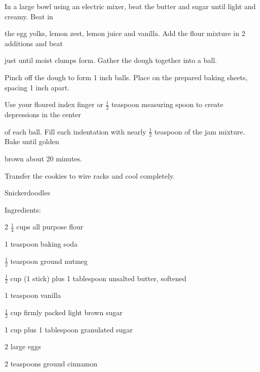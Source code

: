 \documentclass[a4paper,portrait,12pt]{book}
\begin{document}
In a large bowl using an electric mixer, beat the butter and sugar until light and creamy. Beat in




the egg yolks, lemon zest, lemon juice and vanilla. Add the flour mixture in 2 additions and beat




just until moist clumps form. Gather the dough together into a ball.




Pinch off the dough to form 1 inch balls. Place on the prepared baking sheets, spacing 1 inch apart.




Use your floured index finger or $\frac{1}{2}$ teaspoon measuring spoon to create depressions in the center




of each ball. Fill each indentation with nearly $\frac{1}{2}$ teaspoon of the jam mixture. Bake until golden




brown about 20 minutes.




Transfer the cookies to wire racks and cool completely.







\newpage
Snickerdoodles




Ingredients:




2 $\frac{1}{4}$ cups all purpose flour




1 teaspoon baking soda




$\frac{1}{2}$ teaspoon ground nutmeg




$\frac{1}{2}$ cup (1 stick) plus 1 tablespoon unsalted butter, softened




1 teaspoon vanilla




$\frac{1}{2}$ cup firmly packed light brown sugar




1 cup plus 1 tablespoon granulated sugar




2 large eggs




2 teaspoons ground cinnamon
\end{document}
